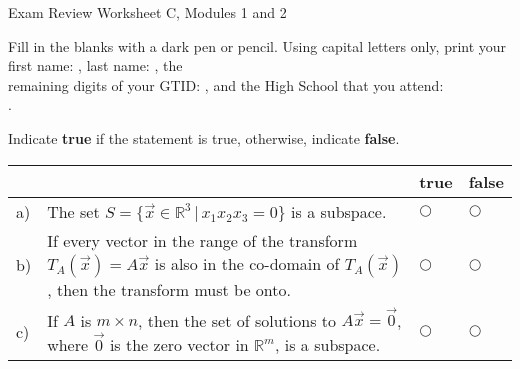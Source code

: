 \documentclass[12pt]{exam}
\newcommand{\Semester}{Fall}
\newcommand{\TestName}{Exam Review Worksheet C, Modules 1 and 2}
\begin{document}
    
\begin{center}
{\Large \TestName} %
\end{center}


\begin{questions}
\question[1] Fill in the blanks with a dark pen or pencil. 
Using capital letters only, print your first name: \framebox{\strut\hspace{5cm}}, last name: \framebox{\strut\hspace{5cm}}, the \\[2pt] remaining digits of your GTID:  \framebox{\strut\hspace{0.2cm}}\framebox{\strut\hspace{0.2cm}}\framebox{\strut\hspace{0.2cm}}\framebox{\strut\hspace{0.2cm}}\framebox{\strut\hspace{0.2cm}}\framebox{\strut\hspace{0.2cm}}\framebox{\strut\hspace{0.2cm}}, and the High School that you attend: \\[2pt]\framebox{\strut\hspace{6cm}}.

\question[5] Indicate \textbf{true} if the statement is true, otherwise, indicate \textbf{false}.

    \vspace{-0.8cm}
    \setlength{\extrarowheight}{0.20cm}
    \begin{center}
    \hspace{-.9cm}\begin{tabular}{ p{.15cm} p{13.6cm} p{.6cm} p{.6cm} }
        
        & & true &  false  \\[2pt] \hline 

        a) & The set $S=\{\vec x \in \mathbb R^3 \, | \, x_1  x_2 x_3 = 0 \}$ is a subspace. & $\bigcirc$  & $\bigcirc$ \\

        b) & If every vector in the range of the transform $T_A(\vec  x) = A \vec x$ is also in the co-domain of $T_A(\vec x)$, then the transform must be onto. & $\bigcirc$  & $\bigcirc$ \\ 

        c) & If $A$ is $m\times n$, then the set of solutions to $A\vec x = \vec 0$, where $\vec 0$ is the zero vector in $\mathbb R^m$, is a subspace. & $\bigcirc$  & $\bigcirc$ \\       



\end{tabular}
\end{center}
\end{questions}
\end{document}
